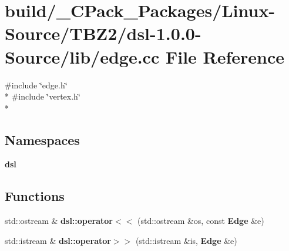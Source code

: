 \section{build/\-\_\-\-C\-Pack\-\_\-\-Packages/\-Linux-\/\-Source/\-T\-B\-Z2/dsl-\/1.0.0-\/\-Source/lib/edge.cc File Reference}
\label{build_2__CPack__Packages_2Linux-Source_2TBZ2_2dsl-1_80_80-Source_2lib_2edge_8cc}
{\ttfamily \#include \char`\"{}edge.\-h\char`\"{}}\\*
{\ttfamily \#include \char`\"{}vertex.\-h\char`\"{}}\\*
\subsection*{Namespaces}
\begin{DoxyCompactItemize}
\item 
{\bf dsl}
\end{DoxyCompactItemize}
\subsection*{Functions}
\begin{DoxyCompactItemize}
\item 
std\-::ostream \& {\bf dsl\-::operator$<$$<$} (std\-::ostream \&os, const {\bf Edge} \&e)
\item 
std\-::istream \& {\bf dsl\-::operator$>$$>$} (std\-::istream \&is, {\bf Edge} \&e)
\end{DoxyCompactItemize}
